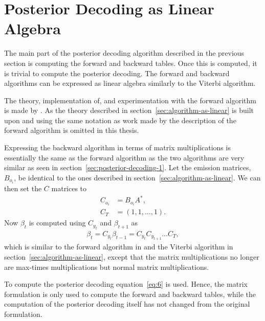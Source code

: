 \section{Posterior Decoding as Linear Algebra}

The main part of the posterior decoding algorithm described in the previous
section is computing the forward and backward tables. Once this is computed, it is
trivial to compute the posterior decoding. The forward and backward algorithms can
be expressed as linear algebra similarly to the Viterbi algorithm.

The theory, implementation of, and experimentation with the forward algorithm
is made by \citet{sand2013ziphmmlib}. As the theory described in
section~\ref{sec:algorithm-as-linear} is built upon and using the same notation
as work made by \citet{sand2013ziphmmlib} the description of the forward
algorithm is omitted in this thesis.

Expressing the backward algorithm in terms of matrix multiplications is
essentially the same as the forward algorithm as the two algorithms are very
similar as seen in section~\ref{sec:posterior-decoding-1}. Let the emission
matrices, $B_{o_i}$, be identical to the ones described in
section~\ref{sec:algorithm-as-linear}. We can then set the $C$ matrices to
\begin{equation}
  \label{eq:4}
  \begin{aligned}
    C_{o_i} & = B_{o_i} A^*, \\
    C_T & = (1, 1, \dots, 1).
  \end{aligned}
\end{equation}
Now $\beta_t$ is computed using $C_{y_t}$ and $\beta_{t + 1}$ as
\begin{equation}
  \label{eq:5}
  \begin{aligned}
    \beta_t = C_{y_t} \beta_{t - 1} = C_{y_t} C_{y_{t+1}}\dots C_T,
  \end{aligned}
\end{equation}
which is similar to the forward algorithm in \citet{sand2013ziphmmlib} and the
Viterbi algorithm in section~\ref{sec:algorithm-as-linear}, except that the
matrix multiplications no longer are max-times multiplications but normal
matrix multiplications.

To compute the posterior decoding equation~\eqref{eq:6} is used. Hence, the
matrix formulation is only used to compute the forward and backward tables,
while the computation of the posterior decoding itself has not changed from the
original formulation.

